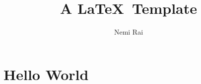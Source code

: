 \documentclass[12pt]{article}
\begin{document}
\title{A \LaTeX\ Template}
\author{Nemi Rai}
\maketitle

\pagebreak 
\tableofcontents

\section{Hello World}

\end{document}

